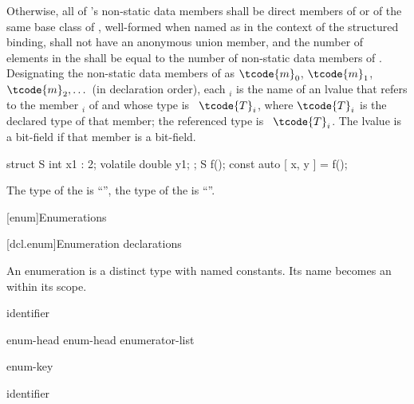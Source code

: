 \pnum
Otherwise,
all of 's non-static data members
shall be direct members of  or
of the same base class of ,
well-formed when named as 
in the context of the structured binding,
 shall not have an anonymous union member, and
the number of elements in the  shall be
equal to the number of non-static data members of .
Designating the non-static data members of  as
$\tcode{m}_0$, $\tcode{m}_1$, $\tcode{m}_2, \dotsc$
(in declaration order),
each $_i$ is the
name of an lvalue that refers to the member $_i$ of  and
whose type is \cv{}~$\tcode{T}_i$, where $\tcode{T}_i$ is the declared type of
that member; the referenced type is \cv{}~$\tcode{T}_i$. The lvalue is a
bit-field if that member is a bit-field.
\begin{example}
\begin{codeblock}
struct S { int x1 : 2; volatile double y1; };
S f();
const auto [ x, y ] = f();
\end{codeblock}
The type of the   is ``'',
the type of the   is ``''.
\end{example}

[enum]{Enumerations}%

[dcl.enum]{Enumeration declarations}%
%
%

\pnum
An enumeration is a distinct type with named
constants. Its name becomes an  within its scope.

\begin{bnf}
\br
    identifier
\end{bnf}

\begin{bnf}
\br
    enum-head \terminal{\{}  \terminal{\}}\br
    enum-head \terminal{\{} enumerator-list \terminal{,} \terminal{\}}
\end{bnf}

\begin{bnf}
\br
    enum-key   
\end{bnf}

\begin{bnf}
\br
     identifier
\end{bnf}

